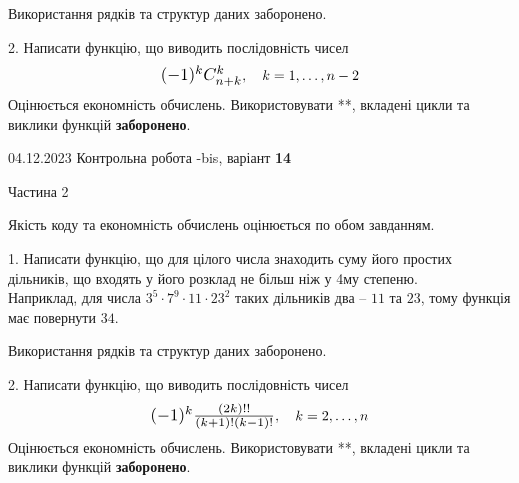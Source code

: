 \documentclass[12pt, ukrainian]{article}
\begin{document}
{{{{{{{{{{{{{\begin {Large}
 Використання рядків та структур даних заборонено. 



\vspace{10mm}



2. 
Написати функцію, що виводить послідовність чисел
$$\scalebox{1.2}{$(-1)^{k}C_{n+k}^{k}$}, \quad k=1,\ldots,n-2$$
Оцінюється економність обчислень. Використовувати **, вкладені цикли та виклики функцій \textbf{заборонено}.

\end{Large}\newpage




\begin {Huge}
{{04.12.2023 Контрольна робота -bis, варіант  \No \textbf { 14 }\par}}

\begin{center}Частина 2
\end{center}
\vspace{10mm}
\end {Huge}

{
\begin {Large}
Якість коду та економність обчислень оцінюється по обом завданням. 

\vspace{5mm}

1. Написати функцію, що для цілого числа знаходить суму його простих дільників, що входять у його розклад не більш ніж у 4му степеню. \\ Наприклад, для числа $3^5{\cdot}7^9{\cdot}11{\cdot}23^{2}$ таких дільників два – $11$ та $23$, тому функція має повернути $34$.

 Використання рядків та структур даних заборонено. 



\vspace{10mm}



2. 
Написати функцію, що виводить послідовність чисел
$$\scalebox{1.2}{$(-1)^{k}\frac{(2k)!!}{(k+1)!(k-1)!}$}, \quad k=2,\ldots,n$$
Оцінюється економність обчислень. Використовувати **, вкладені цикли та виклики функцій \textbf{заборонено}.

\end{Large}\newpage




}}}}}}}}}}}}}}
\end{document}
